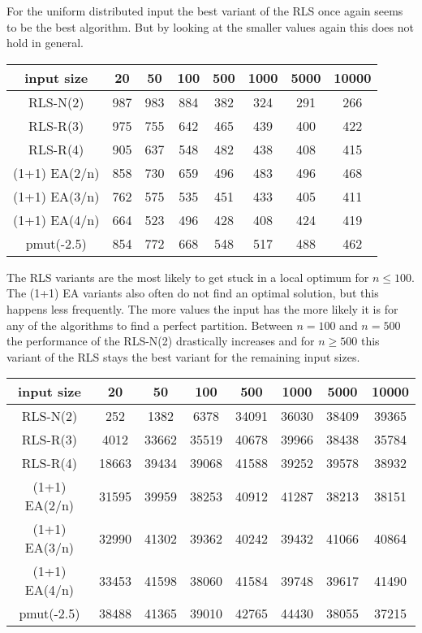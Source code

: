 For the uniform distributed input the best variant of the RLS once again seems to be the best algorithm.
But by looking at the smaller values again this does not hold in general.

\begin{tabular}[h]{cccccccc}
      input size    & 20  & 50  & 100 & 500 & 1000 & 5000 & 10000 \\\hline
      RLS-N(2)      & 987 & 983 & 884 & 382 & 324  & 291  & 266   \\
      RLS-R(3)      & 975 & 755 & 642 & 465 & 439  & 400  & 422   \\
      RLS-R(4)      & 905 & 637 & 548 & 482 & 438  & 408  & 415   \\
      (1+1) EA(2/n) & 858 & 730 & 659 & 496 & 483  & 496  & 468   \\
      (1+1) EA(3/n) & 762 & 575 & 535 & 451 & 433  & 405  & 411   \\
      (1+1) EA(4/n) & 664 & 523 & 496 & 428 & 408  & 424  & 419   \\
      pmut(-2.5)    & 854 & 772 & 668 & 548 & 517  & 488  & 462   \\
\end{tabular}

The RLS variants are the most likely to get stuck in a local optimum for $n\le100$. The (1+1) EA variants also often do not find an optimal solution, but this happens less frequently. The more values the input has the more likely it is for any of the algorithms to find a perfect partition. Between $n=100$ and $n=500$ the performance of the RLS-N(2) drastically increases and for $n\ge500$ this variant of the RLS stays the best variant for the remaining input sizes.

\begin{tabular}[h]{cccccccc}
      input size    & 20    & 50    & 100   & 500   & 1000  & 5000  & 10000 \\\hline
      RLS-N(2)      & 252   & 1382  & 6378  & 34091 & 36030 & 38409 & 39365 \\
      RLS-R(3)      & 4012  & 33662 & 35519 & 40678 & 39966 & 38438 & 35784 \\
      RLS-R(4)      & 18663 & 39434 & 39068 & 41588 & 39252 & 39578 & 38932 \\
      (1+1) EA(2/n) & 31595 & 39959 & 38253 & 40912 & 41287 & 38213 & 38151 \\
      (1+1) EA(3/n) & 32990 & 41302 & 39362 & 40242 & 39432 & 41066 & 40864 \\
      (1+1) EA(4/n) & 33453 & 41598 & 38060 & 41584 & 39748 & 39617 & 41490 \\
      pmut(-2.5)    & 38488 & 41365 & 39010 & 42765 & 44430 & 38055 & 37215 \\
\end{tabular}


